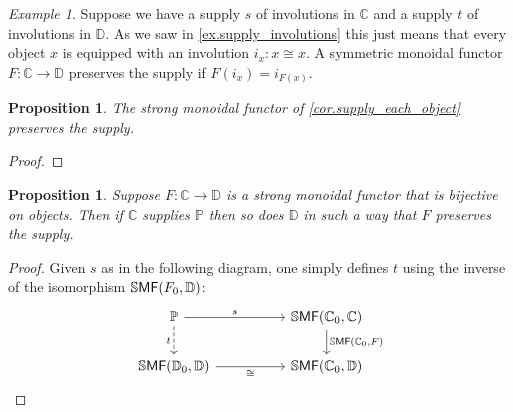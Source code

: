 \documentclass[11pt, oneside, article]{memoir}
\theoremstyle{plain}
\newtheorem{proposition}[theorem]{Proposition}
\theoremstyle{definition}
\theoremstyle{remark}
\newtheorem{example}[theorem]{Example}
\newcommand{\ccat}[1]{\mathbb{#1}}%
\newcommand{\Cat}[1]{{\mathsf{#1}}}%
\newcommand{\CCat}[1]{\mathbb{\StrLeft{#1}{1}}\Cat{\StrGobbleLeft{#1}{1}}}%
\newcommand{\ssmf}{\CCat{SMF}}
\newcommand{\cc}{\mathbb{C}}
\newcommand{\dd}{\mathbb{D}}
\newcommand{\pp}{\mathbb{P}}
\newcommand{\mob}[1]{#1_0}
\begin{document}
\begin{example}\label{ex.preserve_involutions}
Suppose we have a supply $s$ of involutions in $\cc$ and a supply $t$ of involutions in $\dd$. As we saw in \cref{ex.supply_involutions} this just means that every object $x$ is equipped with an involution $i_x\colon x\cong x$. A symmetric monoidal functor $F\colon\cc\to\dd$ preserves the supply if $F(i_x)=i_{F(x)}$.
\end{example}

\begin{proposition}
  The strong monoidal functor of \cref{cor.supply_each_object} preserves the supply.
\end{proposition}
\begin{proof}
\end{proof} 

\begin{proposition}\label{prop.strong_bo}
Suppose $F\colon\cc\to\dd$ is a strong monoidal functor that is bijective on objects. Then if $\cc$ supplies $\ccat{P}$ then so does $\dd$ in such a way that $F$ preserves the supply.
\end{proposition}
\begin{proof}
Given $s$ as in the following diagram, one simply defines $t$ using the inverse of the isomorphism $\ssmf(\mob{F},\dd)$:
\[
\begin{tikzcd}[column sep=50pt]
	\pp\ar[r, "s"]\ar[d, dashed, "t"']&
	\ssmf(\mob{\cc},\cc)\ar[d, "{\ssmf(\mob{\cc},F)}"]\\
	\ssmf(\mob{\dd},\dd)\ar[r, "\cong"']&
	\ssmf(\mob{\cc},\dd)
\end{tikzcd}
\qedhere
\]
\end{proof}



\printbibliography
\end{document}
